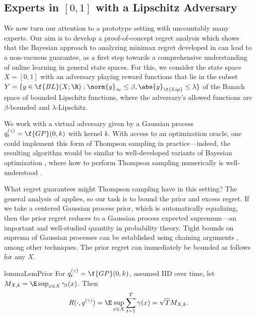 \documentclass[preprint,12pt]{colt2025}
\begin{document}
\subsection{Experts in \texorpdfstring{$[0,1]$}{[0,1]} with a Lipschitz Adversary}
\label{sec:bounded-Lipschitz}

We now turn our attention to a prototype setting with uncountably many experts.
Our aim is to develop a proof-of-concept regret analysis which shows that the Bayesian approach to analyzing minimax regret developed in  can lead to a non-vacuous guarantee, as a first step towards a comprehensive understanding of online learning in general state spaces.
For this, we consider the state space $X = [0,1]$ with an adversary playing reward functions that lie in the subset $Y = \{y\in\f{BL}(X;\R) : \norm{y}_\infty \leq \beta, \abs{y}_{\f{Lip}} \leq \lambda\}$ of the Banach space of bounded Lipschitz functions, where the adversary's allowed functions are $\beta$-bounded and $\lambda$-Lipschitz.

We work with a virtual adversary given by a Gaussian process $q^{(\gamma)}_t = \f{GP}(0,k)$  with kernel $k$.
With access to an optimization oracle, one could implement this form of Thompson sampling in practice---indeed, the resulting algorithm would be similar to well-developed variants of Bayesian optimization \cite{frazier18,garnett23}, where how to perform Thompson sampling numerically is well-understood \cite{wilson20,wilson21}.

What regret guarantees might Thompson sampling have in this setting? 
The general analysis of  applies, so our task is to bound the prior and excess regret. 
If we take a centered Gaussian process prior, which is automatically equalizing, then the prior regret reduces to a Gaussian process expected supremum---an important and well-studied quantity in probability theory. 
Tight bounds on suprema of Gaussian processes can be established using chaining arguments \cite{talagrand2005generic}, among other techniques. 
The prior regret can immediately be bounded as follows for any $X$.

\begin{restatable}{lemma}{LemPrior}
For $q^{(\gamma)}_t = \f{GP}(0,k)$, assumed IID over time, let $M_{X,k} = \E\sup_{x\in X}\gamma_t(x)$.
Then
\[
R(\cdot, q^{(\gamma)}) = \E\sup_{x\in X}\sum_{t=1}^T \gamma(x) = \sqrt{T} M_{X,k}
.
\]
\end{restatable}
\end{document}
